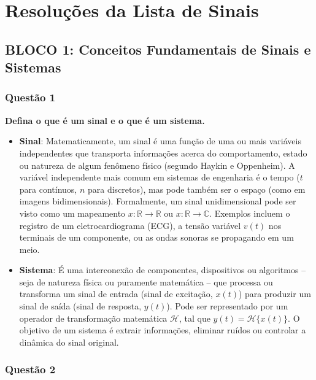\chapter{Resoluções da Lista de Sinais}

\section{BLOCO 1: Conceitos Fundamentais de Sinais e Sistemas}\label{bloco-1-conceitos-fundamentais-de-sinais-e-sistemas}

\subsection{Questão 1}\label{questuxe3o-1}

\textbf{Defina o que é um sinal e o que é um sistema.}

\begin{itemize}
\tightlist
\item
  \textbf{Sinal}: Matematicamente, um sinal é uma função de uma ou mais variáveis independentes que transporta informações acerca do comportamento, estado ou natureza de algum fenômeno físico (segundo Haykin e Oppenheim). A variável independente mais comum em sistemas de engenharia é o tempo (\(t\) para contínuos, \(n\) para discretos), mas pode também ser o espaço (como em imagens bidimensionais). Formalmente, um sinal unidimensional pode ser visto como um mapeamento \(x: \mathbb{R} \to \mathbb{R}\) ou \(x: \mathbb{R} \to \mathbb{C}\). Exemplos incluem o registro de um eletrocardiograma (ECG), a tensão variável \(v(t)\) nos terminais de um componente, ou as ondas sonoras se propagando em um meio.
\item
  \textbf{Sistema}: É uma interconexão de componentes, dispositivos ou algoritmos -- seja de natureza física ou puramente matemática -- que processa ou transforma um sinal de entrada (sinal de excitação, \(x(t)\)) para produzir um sinal de saída (sinal de resposta, \(y(t)\)). Pode ser representado por um operador de transformação matemática \(\mathcal{H}\), tal que \(y(t) = \mathcal{H}\{x(t)\}\). O objetivo de um sistema é extrair informações, eliminar ruídos ou controlar a dinâmica do sinal original.
\end{itemize}

\subsection{Questão 2}\label{questuxe3o-2}

